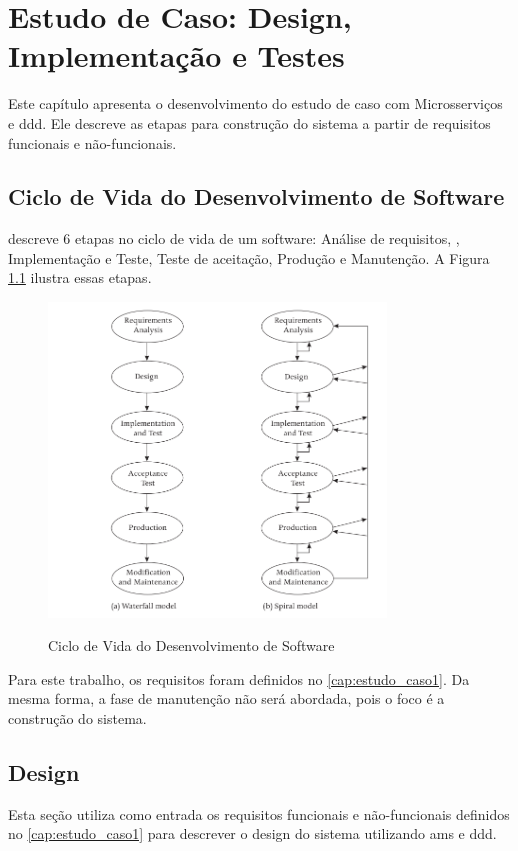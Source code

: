\chapter{Estudo de Caso: Design, Implementação e Testes}
\label{cap:estudo_caso2}

Este capítulo apresenta o desenvolvimento do estudo de caso com Microsserviços e \acrshort{ddd}. Ele descreve as etapas para construção do sistema a partir de requisitos funcionais e não-funcionais.

\section{Ciclo de Vida do Desenvolvimento de Software}
 descreve 6 etapas no ciclo de vida de um software: Análise de requisitos, , Implementação e Teste, Teste de aceitação, Produção e Manutenção. A Figura \ref{fig:ciclo-vida} ilustra essas etapas. 

\begin{figure}[H]
    \centering
    \caption{Ciclo de Vida do Desenvolvimento de Software}
    \includegraphics[width=0.8\textwidth]{media/software-life-cycle.png}
    \label{fig:ciclo-vida}
\end{figure}

Para este trabalho, os requisitos foram definidos no \autoref{cap:estudo_caso1}. Da mesma forma, a fase de manutenção não será abordada, pois o foco é a construção do sistema.

\section{Design}
Esta seção utiliza como entrada os requisitos funcionais e não-funcionais definidos no \autoref{cap:estudo_caso1} para descrever o design do sistema utilizando \acrfull{ams} e \acrfull{ddd}.

